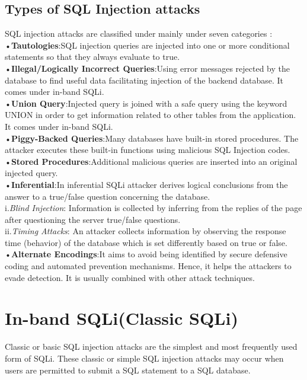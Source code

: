 \documentclass[12pt]{article}
\begin{document}
\subsection{Types of SQL Injection attacks}
SQL injection attacks are classified under mainly under seven 
categories \cite{chen2019research}:
•\textbf{Tautologies}:SQL injection queries are injected into one 
or more conditional statements so that they 
always evaluate to true.\\
•\textbf{Illegal/Logically Incorrect Queries}:Using error messages rejected by the 
database to find useful data facilitating 
injection of the backend database. It comes under in-band SQLi.
\\
•\textbf{Union Query}:Injected query is joined with a safe query 
using the keyword UNION in order to get 
information related to other tables from the 
application. It comes under in-band SQLi.\\
•\textbf{Piggy-Backed Queries}:Many databases have built-in stored procedures. The attacker executes these built-in functions using malicious SQL Injection codes.\\ 
•\textbf{Stored Procedures}:Additional malicious queries are inserted into an original injected query.\\
•\textbf{Inferential}:In inferential SQLi attacker derives logical conclusions from the answer to a true/false question 
concerning the database.\\
i.\emph{Blind Injection}:
Information is collected by inferring from the replies of the page after questioning the server true/false questions.\\
ii.\emph{Timing Attacks}:
An attacker collects information by observing the response time (behavior) of the database which is set differently based on true or false.\\ 
•\textbf{Alternate Encodings}:It aims to avoid being identified by secure defensive coding and automated prevention mechanisms. Hence, it helps the attackers to evade detection. It is usually combined with other attack techniques.\\
\newpage
\section{In-band SQLi(Classic SQLi)}
Classic or basic SQL injection attacks are the simplest and most frequently used form of SQLi. These classic or simple SQL injection attacks may occur when users are permitted to submit a SQL statement to a SQL database.
\end{document}

